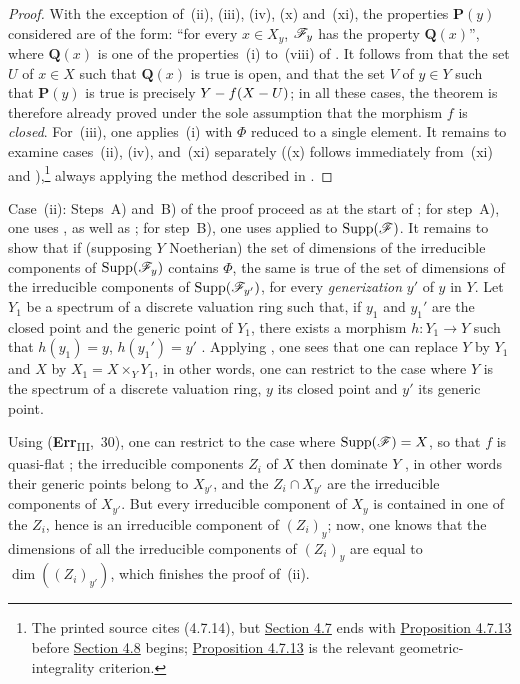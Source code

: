 \begin{proof}
With the exception of~(ii), (iii), (iv), (x) and~(xi), the properties $\boldsymbol{P}(y)$ considered are of the form: ``for every $x\in X_y$, $\mathscr{F}_y$ has the property $\boldsymbol{Q}(x)$'', where $\boldsymbol{Q}(x)$ is one of the properties~(i) to~(viii) of .
It follows from  that the set $U$ of $x\in X$ such that $\boldsymbol{Q}(x)$ is true is open, and that the set $V$ of $y\in Y$ such that $\boldsymbol{P}(y)$ is true is precisely $Y- f(X- U)$; in all these cases, the theorem is therefore already proved under the sole assumption that the morphism $f$ is \emph{closed}.
For~(iii), one applies~(i) with $\Phi$ reduced to a single element.
It remains to examine cases~(ii), (iv), and~(xi) separately ((x) follows immediately from~(xi) and ),\footnote{The printed source cites (4.7.14), but {\hyperref[subsection:IV.4.7]{Section 4.7}} ends with {\hyperref[IV.4.7.13]{Proposition 4.7.13}} before {\hyperref[subsection:IV.4.8]{Section 4.8}} begins; {\hyperref[IV.4.7.13]{Proposition 4.7.13}} is the relevant geometric-integrality criterion.} always applying the method described in .
\end{proof}

\begin{env}[12.2.1.1]
\label{IV.12.2.1.1}
Case~(ii): Steps~A) and~B) of the proof proceed as at the start of ; for step~A), one uses ,  as well as ; for step~B), one uses  applied to $\operatorname{Supp}(\mathscr{F})$.
It remains to show that if (supposing $Y$ Noetherian) the set of dimensions of the irreducible components of $\operatorname{Supp}(\mathscr{F}_y)$ contains $\Phi$, the same is true of the set of dimensions of the irreducible components of $\operatorname{Supp}(\mathscr{F}_{y'})$, for every \emph{generization} $y'$ of $y$ in $Y$.
Let $Y_1$ be a spectrum of a discrete valuation ring such that, if $y_1$ and $y_1'$ are the closed point and the generic point of $Y_1$, there exists a morphism $h:Y_1\to Y$ such that $h(y_1)=y$, $h(y_1')=y'$ .
Applying , one sees that one can replace $Y$ by $Y_1$ and $X$ by $X_1=X\times_Y Y_1$, in other words, one can restrict to the case where $Y$ is the spectrum of a discrete valuation ring, $y$ its closed point and $y'$ its generic point.

Using (\textbf{Err}\textsubscript{III},~30), one can restrict to the case where $\operatorname{Supp}(\mathscr{F})=X$, so that $f$ is quasi-flat ; the irreducible components $Z_i$ of $X$ then dominate $Y$ , in other words their generic points belong to $X_{y'}$, and the $Z_i\cap X_{y'}$ are the irreducible components of $X_{y'}$.
But every irreducible component of $X_y$ is contained in one of the $Z_i$, hence is an irreducible component of $(Z_i)_y$; now, one knows  that the dimensions of all the irreducible components of $(Z_i)_y$ are equal to $\dim((Z_i)_{y'})$, which finishes the proof of~(ii).
\end{env}

